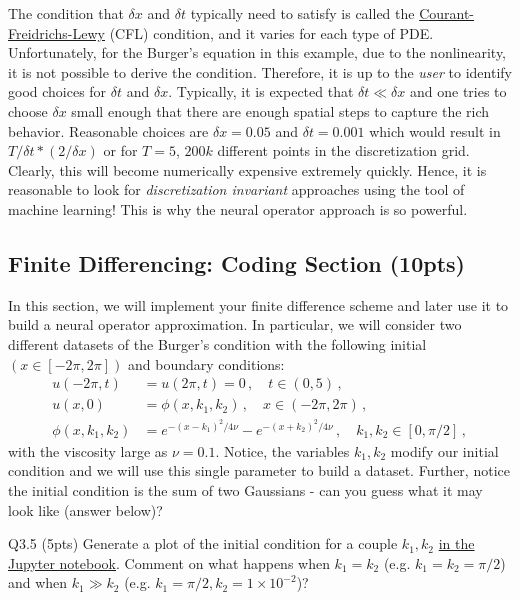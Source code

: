 \documentclass[12pt,letterpaper, onecolumn]{exam}
\theoremstyle{definition}
\begin{document}
The condition that $\delta x$ and $\delta t$ typically need to satisfy is called the \href{https://en.wikipedia.org/wiki/Courant%E2%80%93Friedrichs%E2%80%93Lewy_condition}{Courant-Freidrichs-Lewy}
(CFL) condition, and it varies for each type of PDE. Unfortunately, for the Burger's equation in this example, due to the nonlinearity, it is not possible to derive the condition. Therefore, it is up to the \emph{user} to identify good choices for $\delta t$ and $\delta x$. Typically, it is expected that $\delta t \ll \delta x$ and one tries to choose $\delta x$ small enough that there are enough spatial steps to capture the rich behavior. Reasonable choices are $\delta x = 0.05$ and $\delta t=0.001$ which would result in $T / \delta t * (2/\delta x)$ or for $T = 5$, $200k$ different points in the discretization grid. Clearly, this will become numerically expensive extremely quickly. Hence, it is reasonable to look for \emph{discretization invariant} approaches using the tool of machine learning! This is why the neural operator approach is so powerful. 

\subsection{Finite Differencing: Coding Section (10pts)}
In this section, we will implement your finite difference scheme and later use it to build a neural operator approximation. In particular, we will consider two different datasets of the Burger's condition with the following initial $(x \in [-2\pi, 2\pi])$ and boundary conditions:
\begin{align}
    u(-2\pi,  t) &= u(2\pi, t) = 0\,, \quad t \in (0, 5)\,, \label{eq:bc-1}   \\
    u(x, 0) & = \phi(x, k_1, k_2)\,, \quad x\in (-2\pi, 2\pi)\,, \label{eq:ic-1}  \\
    \phi(x, k_1, k_2) &= e^{-(x-k_1)^2 / 4 \nu} - e^{-(x+k_2)^2 / 4 \nu}\,, \quad k_1, k_2 \in [0, \pi/2]\,, \label{eq:ic-2}
\end{align}
with the viscosity large as $\nu=0.1$. 
Notice, the variables $k_1, k_2$ modify our initial condition and we will use this single parameter to build a dataset. Further, notice the initial condition is the sum of two Gaussians - can you guess what it may look like (answer below)? 

\color{orange} Q3.5 (5pts)\color{black} Generate a plot of the initial condition for a couple $k_1, k_2$ \underline{in the Jupyter notebook}. Comment on what happens when $k_1 = k_2$ (e.g. $k_1 = k_2 = \pi/2 $) and when $k_1 \gg k_2$ (e.g. $k_1 = \pi/2, k_2 =  1 \times 10^{-2}$)? 
\end{document}
